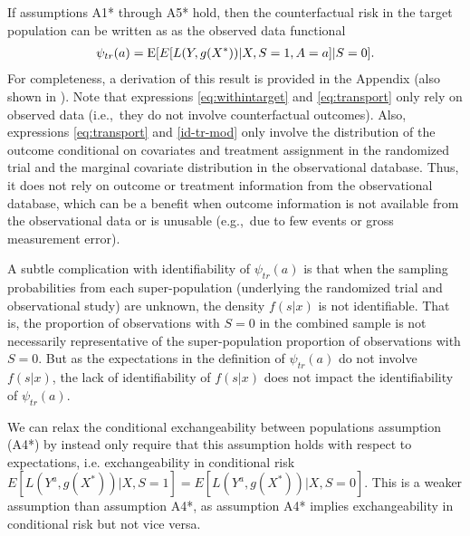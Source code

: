 \documentclass[11pt]{article}
\DeclareMathOperator{\E}{\textnormal{\mbox{E}}}
\begin{document}
If assumptions A1* through A5* hold, then the counterfactual risk in the target population can be written as as the observed data functional
\begin{align}
   \psi_{tr}(a) = \E[ E[ L(Y, g(X^*)) |X, S=1, A=a] |S=0]. \label{eq:transport}
\end{align}
For completeness, a derivation of this result is provided in the Appendix (also shown in \cite{steingrimsson_transporting_2023}). Note that expressions \eqref{eq:withintarget} and \eqref{eq:transport} only rely on observed data (i.e.,~they do not involve counterfactual outcomes). Also, expressions \eqref{eq:transport} and \eqref{id-tr-mod} only involve the distribution of the outcome conditional on covariates and treatment assignment in the randomized trial and the marginal covariate distribution in the observational database. Thus, it does not rely on outcome or treatment information from the observational database, which can be a benefit when outcome information is not available from the observational data or is unusable (e.g.,~due to few events or gross measurement error). 

A subtle complication with identifiability of $\psi_{tr}(a)$ is that when the sampling probabilities from each super-population (underlying the randomized trial and observational study) are unknown, the density $f(s|x)$ is not identifiable. That is, the proportion of observations with $S=0$ in the combined sample is not necessarily representative of the super-population proportion of observations with $S=0$. But as the expectations in the definition of $\psi_{tr}(a)$ do not involve $f(s|x)$, the lack of identifiability of $f(s|x)$ does not impact the identifiability of $\psi_{tr}(a)$.

We can relax the conditional exchangeability between populations assumption (A4*) by instead only require that this assumption holds with respect to expectations, i.e. exchangeability in conditional risk $E[L(Y^a, g(X^*)) |X, S=1] = E[L(Y^a, g(X^*)) |X, S=0]$. This is a weaker assumption than assumption A4*, as assumption A4* implies exchangeability in conditional risk but not vice versa.

\end{document}
